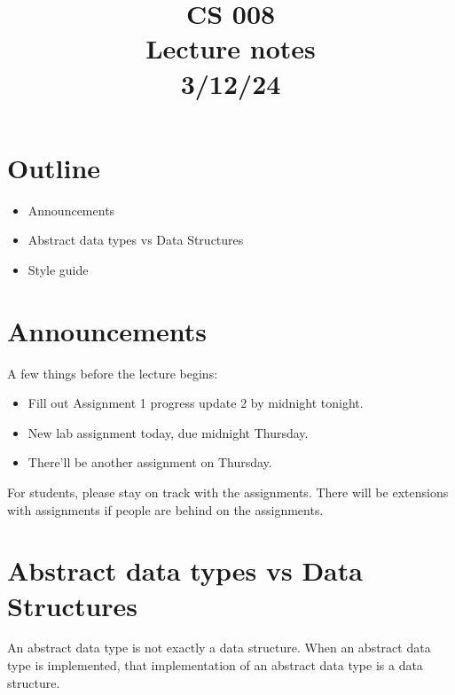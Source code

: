 \documentclass[11pt,a4paper,english]{paper}
\begin{document}
\title{CS 008 \\ Lecture notes \\ 3/12/24}
\maketitle

\section{Outline}

\begin{itemize}

  \item Announcements
  \item Abstract data types vs Data Structures
  \item Style guide

\end{itemize}

\section{Announcements}

A few things before the lecture begins:

\begin{itemize}
  \item Fill out Assignment 1 progress update 2 by midnight tonight.

  \item New lab assignment today, due midnight Thursday.

  \item There'll be another assignment on Thursday.

\end{itemize}

\noindent For students, please stay on track with the assignments. There will be extensions with assignments if people are behind on the assignments.

\section{Abstract data types vs Data Structures}

An abstract data type is not exactly a data structure. When an abstract data type is implemented, that implementation of an abstract data type is a data structure. 

\bigskip
\end{document}
